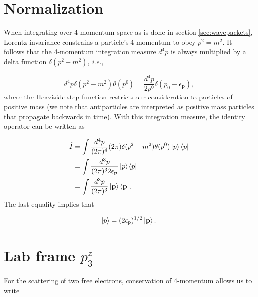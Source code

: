\documentclass{article}
\begin{document}
\section{Normalization}
\label{app:normalization}

When integrating over 4-momentum space as is done in section
\ref{sec:wavepackets}, Lorentz invariance constrains a particle's 4-momentum to
obey $p^2 = m^2$.
It follows that the 4-momentum integration measure $d^4p$ is always multiplied
by a delta function $\delta(p^2-m^2)$, \textit{i.e.},

\begin{equation}
    d^4p\delta(p^2 - m^2)\theta(p^0)
    =
    \frac{d^4p}{2p^0}\delta(p_0 - \epsilon_\mathbf{p}),
\end{equation}
%
where the Heaviside step function restricts our consideration to particles of
positive mass (we note that antiparticles are interpreted as positive mass
particles that propagate backwards in time).  With this integration measure,
the identity operator can be written as

\begin{equation}
\label{eq:identity}
\begin{aligned}
    \hat{I}
    &=
    \int \frac{d^4p}{(2\pi)^4}(2\pi)\delta(p^2 - m^2)\theta(p^0)
    \ket{p}\bra{p}
    \\&=
    \int \frac{d^3p}{(2\pi)^3 2\epsilon_\mathbf{p}}
    \ket{p}\bra{p}
    \\&=
    \int \frac{d^3p}{(2\pi)^3}
    \ket{\mathbf{p}}\bra{\mathbf{p}}.
\end{aligned}
\end{equation}
%
The last equality implies that

\begin{equation}
\label{eq:normalization}
    \ket{p} = (2\epsilon_\mathbf{p})^{1/2}\ket{\mathbf{p}}.
\end{equation}


\pagebreak
\section{Lab frame $p^z_3$}
\label{app:p3z}

For the scattering of two free electrons, conservation of 4-momentum allows us
to write
\end{document}
